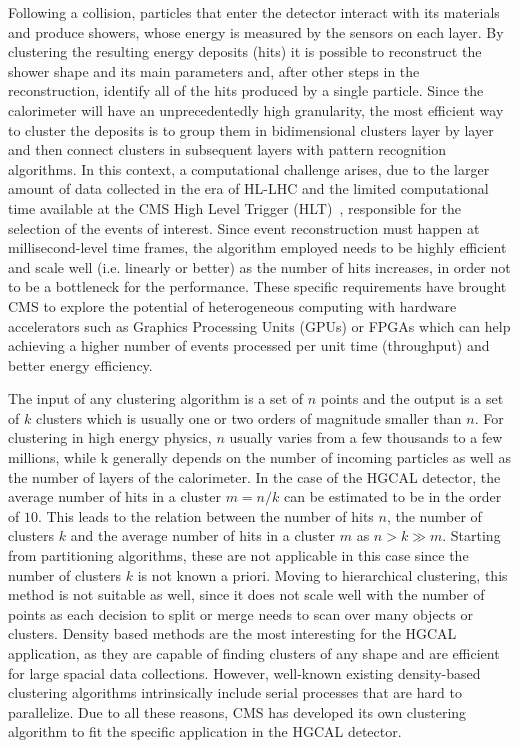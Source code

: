 Following a collision, particles that enter the detector interact with its materials and produce showers, whose energy is measured by the sensors on each layer. By clustering the resulting energy deposits (hits) it is possible to reconstruct the shower shape and its main parameters and, after other steps in the reconstruction, identify all of the hits produced by a single particle. Since the calorimeter will have an unprecedentedly high granularity, the most efficient way to cluster the deposits is to group them in bidimensional clusters layer by layer~\cite{2d} and then connect clusters in subsequent layers with pattern recognition algorithms. In this context, a computational challenge arises, due to the larger amount of data collected in the era of HL-LHC and the limited computational time available at the CMS High Level Trigger (HLT)~\cite{high_level_trigger}, responsible for the selection of the events of interest. Since event reconstruction must happen at millisecond-level time frames, the algorithm employed needs to be highly efficient and scale well (i.e. linearly or better) as the number of hits increases, in order not to be a bottleneck for the performance. These specific requirements have brought CMS to explore the potential of heterogeneous computing with hardware accelerators such as Graphics Processing Units (GPUs) or FPGAs which can help achieving a higher number of events processed per unit time (throughput) and better energy efficiency. 

The input of any clustering algorithm is a set of $n$ points and the output is a set of $k$ clusters which is usually one or two orders of magnitude smaller than $n$. For clustering in high energy physics, $n$ usually varies from a few thousands to a few millions, while k generally depends on the number of incoming particles as well as the number of layers of the calorimeter. In the case of the HGCAL detector, the average number of hits in a cluster $m=n/k$ can be estimated to be in the order of $10$. This leads to the relation between the number of hits $n$, the number of clusters $k$ and the average number of hits in a cluster $m$ as $n > k \gg m$. 
Starting from partitioning algorithms, these are not applicable in this case since the number of clusters $k$ is not known a priori. Moving to hierarchical clustering, this method is not suitable as well, since it does not scale well with the number of points as each decision to split or merge needs to scan over many objects or clusters. Density based methods are the most interesting for the HGCAL application, as they are capable of finding clusters of any shape and are efficient for large spacial data collections. However, well-known existing density-based clustering algorithms intrinsically include serial processes that are hard to parallelize. Due to all these reasons, CMS has developed its own clustering algorithm to fit the specific application in the HGCAL detector.

